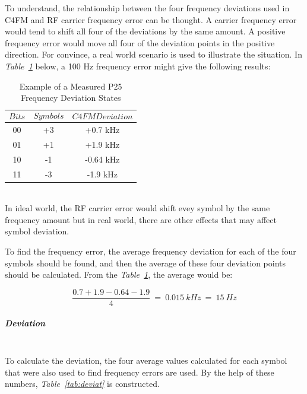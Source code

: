 	To understand, the relationship between the four frequency deviations used in C4FM and RF carrier frequency error can be thought. A carrier frequency error would tend to shift all four of the deviations by the same amount. A positive frequency error would move all four of the deviation points in the positive direction. For convince, a real world scenario is used to illustrate the situation. In \textit{Table~\ref{tab:modfide2}} below, a 100 Hz frequency error might give the following results:


\begin{table}[H]
  \centering
 
    \begin{tabular}{c|c|c}
       $$Bits$$ & $$Symbols$$ & $$C4FM Deviation$$ \\ \hline
       00 & +3 & +0.7 kHz  \\ \hline
       01 & +1 & +1.9 kHz  \\ \hline
       10 & -1 & -0.64 kHz  \\ \hline
       11 & -3 & -1.9 kHz  
      
  \end{tabular}
  \caption{Example of a Measured P25 Frequency Deviation
States}
  \label{tab:modfide2}
\end{table}

\- \\




	In ideal world, the RF carrier error would shift evey symbol by the same frequency amount but in real world, there are other effects that may affect symbol deviation.
	
	To find the frequency error, the average frequency deviation for each of the four symbols should be found, and then the average of these four deviation points should be calculated. From the \textit{Table~\ref{tab:modfide2}}, the average would be:
	
	$$	\frac{0.7+1.9-0.64-1.9}{4}~=~0.015~kHz~=~15~Hz	$$


\subparagraph{Deviation} \- \\
\- \indent
	To calculate the deviation, the four average values calculated for each symbol that were also used to find frequency errors are used. By the help of these numbers, \textit{Table~\ref{tab:deviat}} is constructed.

